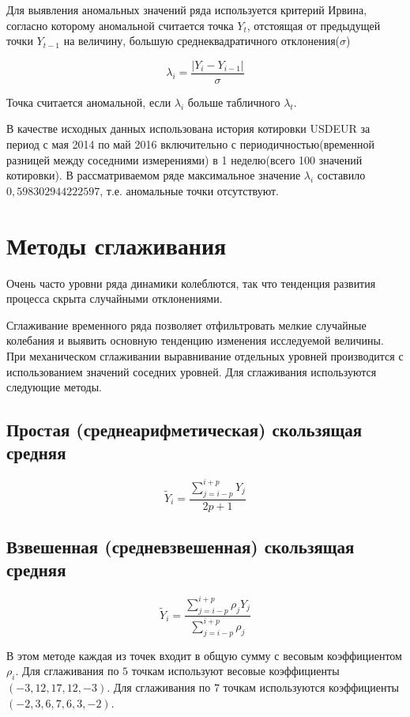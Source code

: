 \documentclass[a4paper,12pt]{article}
\begin{document}
\vspace{0.5cm}
Для выявления аномальных значений ряда используется критерий Ирвина, согласно которому аномальной считается точка $Y_t$, отстоящая от предыдущей точки $Y_{t-1}$ на величину, большую среднеквадратичного отклонения($\sigma$)

$$\lambda_i = \frac{|Y_i - Y_{i-1}|}{\sigma}$$

Точка считается аномальной, если $\lambda_i$ больше табличного $\lambda_t$.

\vspace{0.5cm}
В качестве исходных данных использована  история котировки USDEUR за период с мая 2014 по май 2016 включительно с периодичностью(временной разницей между соседними измерениями) в 1 неделю(всего 100 значений котировки).
В рассматриваемом ряде максимальное значение $\lambda_i$ составило $0,598302944222597$, т.е. аномальные точки отсутствуют.

\newpage\section{Методы сглаживания}
Очень часто уровни ряда динамики колеблются, так что тенденция развития процесса скрыта случайными отклонениями. 

\vspace{0.5cm}
Сглаживание временного ряда позволяет отфильтровать мелкие случайные колебания и выявить основную тенденцию изменения исследуемой величины. При механическом сглаживании выравнивание отдельных уровней производится с использованием значений соседних уровней. Для сглаживания используются следующие методы.

\subsection{Простая (среднеарифметическая) скользящая средняя}
$$\tilde{Y}_i = \frac{\sum\limits_{j=i-p}^{i+p}Y_j}{2p + 1}$$

\subsection{Взвешенная (средневзвешенная) скользящая средняя}
$$\tilde{Y}_i = \frac{\sum\limits_{j=i-p}^{i+p}\rho_jY_j}{\sum\limits_{j=i-p}^{i+p}\rho_j}$$

В этом методе каждая из точек входит в общую сумму с весовым коэффициентом $\rho_i$. Для сглаживания по $5$ точкам используют весовые коэффициенты $(-3, 12, 17, 12, -3)$. Для сглаживания по $7$ точкам используются коэффициенты $(-2, 3, 6, 7, 6, 3, -2)$.
\end{document}
